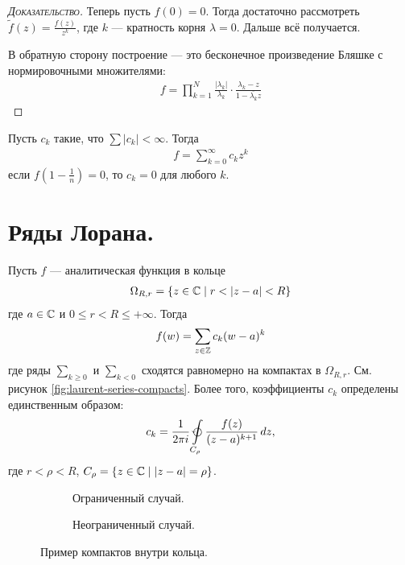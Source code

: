 \documentclass[../../main.tex]{subfiles}
\begin{document}
\begin{proof}[\normalfont\textsc{Доказательство}]
 Теперь пусть $ f(0) = 0 $. Тогда достаточно рассмотреть  $ \tilde f(z) = \frac{f(z)}{z^{k}} $, где $ k $ --- кратность корня $ \lambda = 0 $. Дальше всё получается.

 В обратную сторону построение --- это бесконечное произведение Бляшке с нормировочными множителями:
  \begin{align*}
   f = \prod_{k=1}^{N} \frac{\left| \lambda_k \right|}{\lambda_k} \cdot \frac{\lambda_k -z}{1 - \overline{\lambda_k} z}
 \end{align*}
\end{proof}

\begin{exmpl*}
 Пусть $ c_k $ такие, что $ \sum \left| c_k \right| < \infty $. Тогда
 \begin{align*}
  f = \sum_{k=0}^{\infty} c_k z^{k}
 \end{align*} если $ f\left(1 - \frac{1}{n}\right) = 0 $, то $ c_k = 0 $ для любого $ k $.
\end{exmpl*}

\newpage
\section{Ряды Лорана.}

\begin{thm}
 Пусть $ f $ --- аналитическая функция в кольце
 \begin{align*}
  \Omega_{R,r} = \left\{ z \in \mathbb{C} \mid r < \left| z - a \right| < R \right\}
 \end{align*} где $ a \in \mathbb{C} $ и $ 0 \leqslant r < R \leqslant +\infty $. Тогда
 \begin{align}
  \label{equation:loran_series}
  f(w) = \sum_{z \in \mathbb{Z}} c_k(w - a)^{k}
\end{align} где ряды $ \sum_{k \geqslant 0} $ и $ \sum_{k < 0} $ сходятся равномерно на компактах в $ \Omega_{R,r} $. См. рисунок \eqref{fig:laurent-series-compacts}. Более того, коэффициенты $ c_k $ определены единственным образом:
 \begin{align*}
  c_k = \frac{1}{2\pi i} \varointctrclockwise\limits_{C_\rho}   \frac{f(z)}{(z-a)^{k+1}}\,dz,
 \end{align*} где $ r < \rho < R $, $ C_\rho = \left\{ z \in \mathbb{C} \mid \left| z-a \right|=\rho \right\} $.
\end{thm}

\begin{figure}[h]

\begin{subfigure}{0.5\textwidth}
    \caption{Ограниченный случай.}
    \label{fig:laurent-series-compacts-limited}
\end{subfigure}
\begin{subfigure}{0.5\textwidth}
	\caption{Неограниченный случай.}
    \label{fig:laurent-series-compacts-not-limited}
\end{subfigure}

\caption{Пример компактов внутри кольца.}
\label{fig:laurent-series-compacts}
\end{figure}
\end{document}
